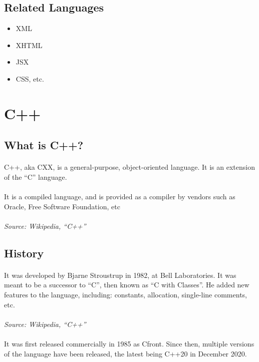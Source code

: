 \documentclass{article}
\begin{document}
\subsection{Related Languages}
\begin{itemize}
	\item XML
	\item XHTML
	\item JSX
	\item CSS, etc.
\end{itemize}

\section{C++}
\subsection{What is C++?}
\paragraph{}C++, aka CXX, is a general-purpose, object-oriented language.
It is an extension of the “C” language.
\paragraph{}It is a compiled language, and is provided as a compiler by vendors such as Oracle, Free Software Foundation, etc
\paragraph{}\textit{Source: Wikipedia, “C++”}
\subsection{History}
\paragraph{}It was developed by Bjarne Stroustrup in 1982, at Bell Laboratories. It was meant to be a successor to “C”, then known as “C with Classes”.
He added new features to the language, including: constants, allocation, single-line comments, etc.
\paragraph{}\textit{Source: Wikipedia, “C++”}
\paragraph{}It was first released commercially in 1985 as Cfront.
Since then, multiple versions of the language have been released, the latest being C++20 in December 2020.
\end{document}
